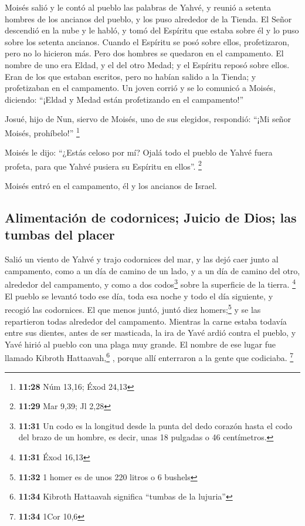 \begin{paracol}{2}
 Moisés salió y le contó al pueblo las palabras de Yahvé,
y reunió a setenta hombres de los ancianos del pueblo, y los puso
alrededor de la Tienda.  El Señor descendió en la nube y
le habló, y tomó del Espíritu que estaba sobre él y lo puso sobre los
setenta ancianos. Cuando el Espíritu se posó sobre ellos, profetizaron,
pero no lo hicieron más.  Pero dos hombres se quedaron en
el campamento. El nombre de uno era Eldad, y el del otro Medad; y el
Espíritu reposó sobre ellos. Eran de los que estaban escritos, pero no
habían salido a la Tienda; y profetizaban en el campamento.
 Un joven corrió y se lo comunicó a Moisés, diciendo:
``¡Eldad y Medad están profetizando en el campamento!''

 Josué, hijo de Nun, siervo de Moisés, uno de sus
elegidos, respondió: ``¡Mi señor Moisés, prohíbelo!'' \footnote{\textbf{11:28}
  Núm 13,16; Éxod 24,13}

 Moisés le dijo: ``¿Estás celoso por mí? Ojalá todo el
pueblo de Yahvé fuera profeta, para que Yahvé pusiera su Espíritu en
ellos''. \footnote{\textbf{11:29} Mar 9,39; Jl 2,28}

 Moisés entró en el campamento, él y los ancianos de
Israel.

\hypertarget{alimentaciuxf3n-de-codornices-juicio-de-dios-las-tumbas-del-placer}{%
\subsection{Alimentación de codornices; Juicio de Dios; las tumbas del
placer}\label{alimentaciuxf3n-de-codornices-juicio-de-dios-las-tumbas-del-placer}}

 Salió un viento de Yahvé y trajo codornices del mar, y
las dejó caer junto al campamento, como a un día de camino de un lado, y
a un día de camino del otro, alrededor del campamento, y como a dos
codos\footnote{\textbf{11:31} Un codo es la longitud desde la punta del
  dedo corazón hasta el codo del brazo de un hombre, es decir, unas 18
  pulgadas o 46 centímetros.} sobre la superficie de la tierra.
\footnote{\textbf{11:31} Éxod 16,13}  El pueblo se
levantó todo ese día, toda esa noche y todo el día siguiente, y recogió
las codornices. El que menos juntó, juntó diez homers;\footnote{\textbf{11:32}
  1 homer es de unos 220 litros o 6 bushels} y se las repartieron todas
alrededor del campamento.  Mientras la carne estaba
todavía entre sus dientes, antes de ser masticada, la ira de Yavé ardió
contra el pueblo, y Yavé hirió al pueblo con una plaga muy grande.
 El nombre de ese lugar fue llamado Kibroth
Hattaavah,\footnote{\textbf{11:34} Kibroth Hattaavah significa ``tumbas
  de la lujuria''} , porque allí enterraron a la gente que codiciaba.
\footnote{\textbf{11:34} 1Cor 10,6}


\end{paracol}
